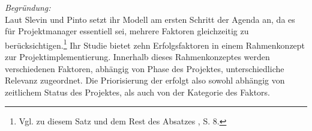 \noindent\textit{Begründung:}\\\noindent
Laut Slevin und Pinto setzt ihr Modell am ersten Schritt der Agenda an, da
es für Projektmanager essentiell sei, mehrere Faktoren gleichzeitig zu berücksichtigen.\footnote{Vgl. zu diesem Satz und dem Rest des Absatzes \cite{Slevin.1987}, S. 8.}
Ihr Studie bietet zehn Erfolgsfaktoren in einem Rahmenkonzept zur Projektimplementierung.
Innerhalb dieses Rahmenkonzeptes werden verschiedenen Faktoren, abhängig von Phase des Projektes, unterschiedliche Relevanz zugeordnet.
Die Priorisierung der \EF erfolgt also sowohl abhängig von zeitlichem Status des Projektes, als auch von der Kategorie des Faktors.

